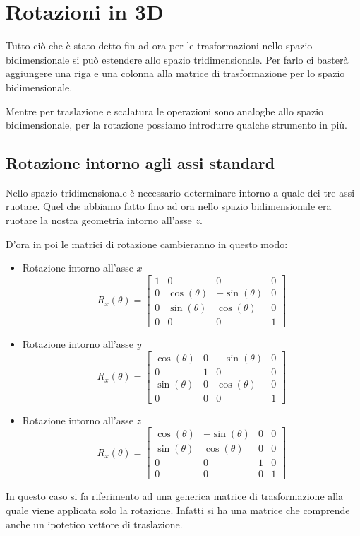 \chapter{Rotazioni in 3D}\label{3D}
Tutto ci\`o che \`e stato detto fin ad ora per le trasformazioni nello spazio bidimensionale si pu\`o estendere allo
spazio tridimensionale. Per farlo ci baster\`a aggiungere una riga e una colonna alla matrice di trasformazione per lo
spazio bidimensionale.

Mentre per traslazione e scalatura le operazioni sono analoghe allo spazio bidimensionale, per la rotazione possiamo
introdurre qualche strumento in pi\`u.

\section{Rotazione intorno agli assi standard}
Nello spazio tridimensionale \`e necessario determinare intorno a quale dei tre assi ruotare. Quel che abbiamo fatto
fino ad ora nello spazio bidimensionale era ruotare la nostra geometria intorno all'asse $z$.

D'ora in poi le matrici di rotazione cambieranno in questo modo:
\begin{itemize}
	\item Rotazione intorno all'asse $x$
	      \[
		      R_x(\theta) = \begin{bmatrix}
			      1 & 0            & 0             & 0 \\
			      0 & \cos(\theta) & -\sin(\theta) & 0 \\
			      0 & \sin(\theta) & \cos(\theta)  & 0 \\
			      0 & 0            & 0             & 1
		      \end{bmatrix}
	      \]
	\item Rotazione intorno all'asse $y$
	      \[
		      R_x(\theta) = \begin{bmatrix}
			      \cos(\theta) & 0 & -\sin(\theta) & 0 \\
			      0            & 1 & 0             & 0 \\
			      \sin(\theta) & 0 & \cos(\theta)  & 0 \\
			      0            & 0 & 0             & 1
		      \end{bmatrix}
	      \]
	\item Rotazione intorno all'asse $z$
	      \[
		      R_x(\theta) = \begin{bmatrix}
			      \cos(\theta) & -\sin(\theta) & 0 & 0 \\
			      \sin(\theta) & \cos(\theta)  & 0 & 0 \\
			      0            & 0             & 1 & 0 \\
			      0            & 0             & 0 & 1
		      \end{bmatrix}
	      \]
\end{itemize}
In questo caso si fa riferimento ad una generica matrice di trasformazione alla quale viene applicata solo la rotazione.
Infatti si ha una matrice che comprende anche un ipotetico vettore di traslazione.

